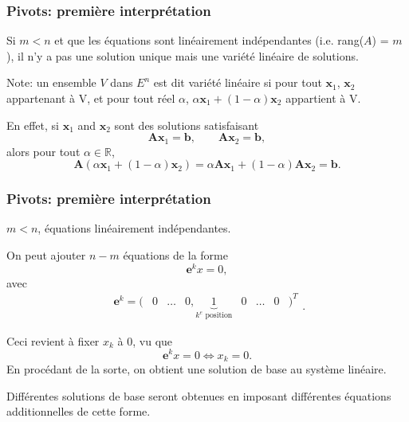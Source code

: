 \documentclass[t,usepdftitle=false]{beamer}
\def\bb{\boldsymbol{b}}
\def\be{\boldsymbol{e}}
\def\bx{\boldsymbol{x}}
\def\bA{\boldsymbol{A}}
\def\RR{\mathbb{R}}
\begin{document}
\begin{frame}
\frametitle{Pivots: première interprétation}

Si $m < n$ et que les équations sont linéairement indépendantes  (i.e. rang($A$) = $m$), il n'y a pas une solution unique mais une variété linéaire de solutions.

\mbox{}

Note: un ensemble $V$ dans $E^n$ est dit {\color{blue}variété linéaire} si pour tout $\bx_1$, $\bx_2$ appartenant à V, et pour tout réel $\alpha$, $\alpha \bx_1 + (1-\alpha)\bx_2$ appartient \`a V.

\mbox{}

En effet, si $\bx_1$ and $\bx_2$ sont des solutions satisfaisant
$$
\bA\bx_1 = \bb, \qquad \bA\bx_2 = \bb,
$$
alors pour tout $\alpha \in \RR$,
$$
\bA(\alpha \bx_1 + (1-\alpha) \bx_2) = \alpha \bA\bx_1 + (1-\alpha) \bA\bx_2 = \bb.
$$

\end{frame}

\begin{frame}
\frametitle{Pivots: première interprétation}

$m < n$, équations linéairement indépendantes.

\mbox{}

On peut ajouter $n-m$ équations de la forme
\[
\be^k x = 0,
\]
avec
\[
 \begin{matrix} \be^k = ( & 0 & \ldots & 0, \underbrace{1}_{k^e \mbox{ position}} & 0 & \dots & 0 & )^T \end{matrix}.
\]

\mbox{}

Ceci revient à fixer $x_k$ à 0, vu que
\[
\be^k x = 0 \Leftrightarrow x_k = 0.
\]
En procédant de la sorte, on obtient une solution de base au système linéaire.

\mbox{}

Différentes solutions de base seront obtenues en imposant différentes équations additionnelles de cette forme.

\end{frame}
\end{document}

